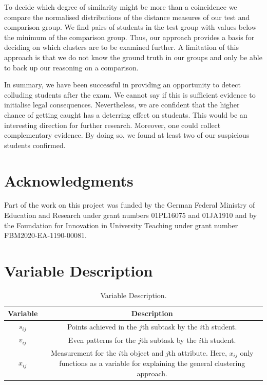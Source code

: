 \documentclass{edm_article}
\begin{document}
To decide which degree of similarity might be more than a coincidence we compare the normalised distributions of the distance measures of our test and comparison group. We find pairs of students in the test group with values below the minimum of the comparison group. Thus, our approach provides a basis for deciding on which clusters are to be examined further. A limitation of this approach is that we do not know the ground truth in our groups and only be able to back up our reasoning on a comparison.

In summary, we have been successful in providing an opportunity to detect colluding students after the exam. We cannot say if this is sufficient evidence to initialise legal consequences. Nevertheless, we are confident that the higher chance of getting caught has a deterring effect on students. This would be an interesting direction for further research. Moreover, one could collect complementary evidence. By doing so, we found at least two of our suspicious students confirmed.


\section{Acknowledgments}
Part of the work on this project was funded by the German Federal
Ministry of Education and Research under grant numbers 01PL16075 and 01JA1910 and by the Foundation for Innovation in University Teaching under grant number FBM2020-EA-1190-00081.


  
\newpage
\appendix
\section{Variable Description} \label{sec:vardesc}

\begin{table}[H]
\caption{Variable Description.}
\label{tab:vardesc}
\begin{center}
\begin{tabular}{cc}
\toprule
Variable & Description \\ 
\midrule
$s_{ij}$ & \parbox{6cm}{Points achieved in the $j$th subtask by the $i$th student.\\}\\ 
$v_{ij}$ & \parbox{6cm}{Even patterns for the $j$th subtask by the $i$th student.\\}\\ 
$x_{ij}$ & \parbox{6cm}{Measurement for the $i$th object and $j$th attribute. Here, $x_{ij}$ only functions as a variable for explaining the general clustering approach.\\}\\  
\bottomrule
\end{tabular} 
\end{center}
\end{table}
\end{document}
